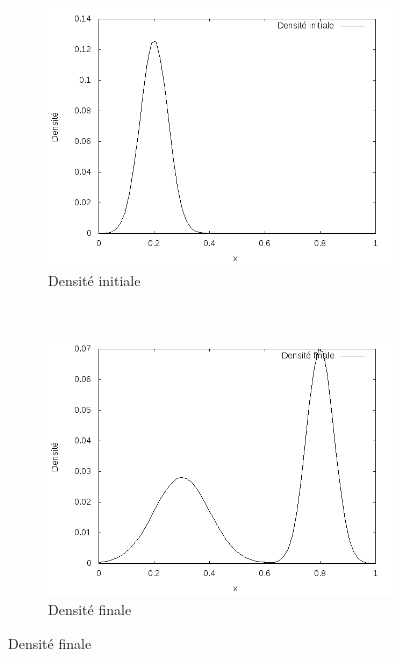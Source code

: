 \documentclass[a4paper,12pt]{article}
\begin{document}
\begin{figure}[!h]
\centering 
	\begin{subfigure}[b]{0.48\linewidth}
	\includegraphics[width=\textwidth]{img/1DMixture/f0.png}
	\caption{Densité initiale}
	\end{subfigure}
	~
	\begin{subfigure}[b]{0.48\linewidth}
	\includegraphics[width=\textwidth]{img/1DMixture/f1.png}
	\caption{Densité finale}
	\end{subfigure}
	

\end{figure}
\end{document}
